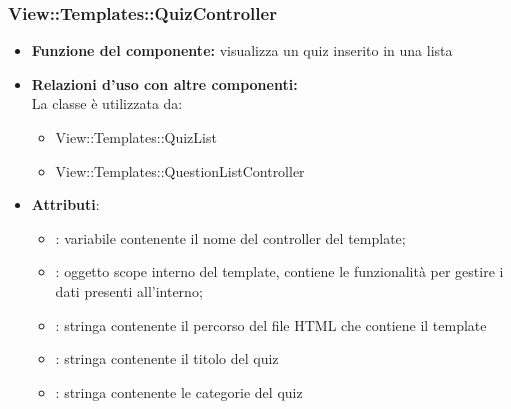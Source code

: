 \subsubsection{View::Templates::QuizController}
\begin{itemize}
\item\textbf{Funzione del componente:} visualizza un quiz inserito in una lista
				\item\textbf{Relazioni d'uso con altre componenti:}\\
 La classe è utilizzata da:
 	\begin{itemize}
 		\item View::Templates::QuizList
 		\item View::Templates::QuestionListController
 	\end{itemize}
 \item\textbf{Attributi}:
 	\begin{itemize}
 		\item{}: variabile contenente il nome del controller del template;\\
		\item{}: oggetto scope interno del template, contiene le funzionalità per gestire i dati presenti all’interno;\\
		\item{}: stringa contenente il percorso del file HTML che contiene il template\\
		\item{}: stringa contenente il titolo del quiz
		\item{}: stringa contenente le categorie del quiz
 	\end{itemize}
 \end{itemize}
 
